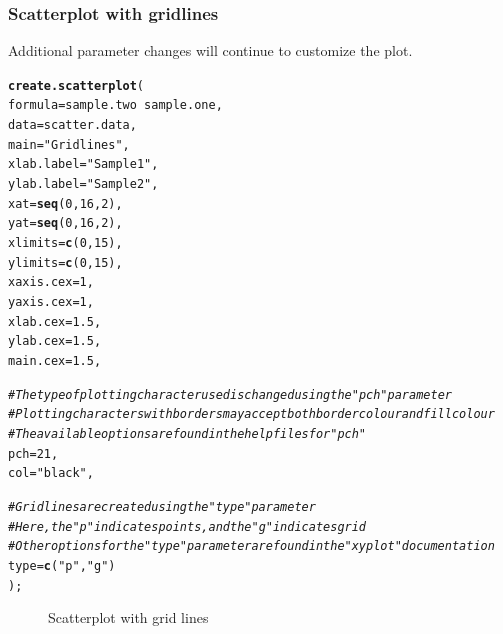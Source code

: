 \documentclass[letterpaper]{article}\usepackage[]{graphicx}\usepackage[]{color}
\makeatletter
\newcommand{\hlnum}[1]{\textcolor[rgb]{0.686,0.059,0.569}{#1}}%
\newcommand{\hlstr}[1]{\textcolor[rgb]{0.192,0.494,0.8}{#1}}%
\newcommand{\hlcom}[1]{\textcolor[rgb]{0.678,0.584,0.686}{\textit{#1}}}%
\newcommand{\hlopt}[1]{\textcolor[rgb]{0,0,0}{#1}}%
\newcommand{\hlstd}[1]{\textcolor[rgb]{0.345,0.345,0.345}{#1}}%
\newcommand{\hlkwc}[1]{\textcolor[rgb]{0.333,0.667,0.333}{#1}}%
\newcommand{\hlkwd}[1]{\textcolor[rgb]{0.737,0.353,0.396}{\textbf{#1}}}%
\newenvironment{kframe}{%
 \def\at@end@of@kframe{}%
 \ifinner\ifhmode%
  \def\at@end@of@kframe{\end{minipage}}%
  \begin{minipage}{\columnwidth}%
 \fi\fi%
 \def\FrameCommand##1{\hskip\@totalleftmargin \hskip-\fboxsep
 \colorbox{shadecolor}{##1}\hskip-\fboxsep
     \hskip-\linewidth \hskip-\@totalleftmargin \hskip\columnwidth}%
 \MakeFramed {\advance\hsize-\width
   \@totalleftmargin\z@ \linewidth\hsize
   \@setminipage}}%
 {\par\unskip\endMakeFramed%
 \at@end@of@kframe}
\newenvironment{knitrout}{}{} %
\makeatother
\begin{document}
\subsubsection{Scatterplot with gridlines}
Additional parameter changes will continue to customize the plot.
\begin{knitrout}
\color{fgcolor}\begin{kframe}
\begin{alltt}
\hlkwd{create.scatterplot}\hlstd{(}
    \hlkwc{formula} \hlstd{= sample.two} \hlopt{~} \hlstd{sample.one,}
    \hlkwc{data} \hlstd{= scatter.data,}
    \hlkwc{main} \hlstd{=} \hlstr{"Gridlines"}\hlstd{,}
    \hlkwc{xlab.label} \hlstd{=} \hlstr{"Sample 1"}\hlstd{,}
    \hlkwc{ylab.label} \hlstd{=} \hlstr{"Sample 2"}\hlstd{,}
    \hlkwc{xat} \hlstd{=} \hlkwd{seq}\hlstd{(}\hlnum{0}\hlstd{,} \hlnum{16}\hlstd{,} \hlnum{2}\hlstd{),}
    \hlkwc{yat} \hlstd{=} \hlkwd{seq}\hlstd{(}\hlnum{0}\hlstd{,} \hlnum{16}\hlstd{,} \hlnum{2}\hlstd{),}
    \hlkwc{xlimits} \hlstd{=} \hlkwd{c}\hlstd{(}\hlnum{0}\hlstd{,} \hlnum{15}\hlstd{),}
    \hlkwc{ylimits} \hlstd{=} \hlkwd{c}\hlstd{(}\hlnum{0}\hlstd{,} \hlnum{15}\hlstd{),}
    \hlkwc{xaxis.cex} \hlstd{=} \hlnum{1}\hlstd{,}
    \hlkwc{yaxis.cex} \hlstd{=} \hlnum{1}\hlstd{,}
    \hlkwc{xlab.cex} \hlstd{=} \hlnum{1.5}\hlstd{,}
    \hlkwc{ylab.cex} \hlstd{=} \hlnum{1.5}\hlstd{,}
    \hlkwc{main.cex} \hlstd{=} \hlnum{1.5}\hlstd{,}

    \hlcom{# The type of plotting character used is changed using the "pch" parameter}
    \hlcom{# Plotting characters with borders may accept both border colour and fill colour}
    \hlcom{# The available options are found in the help files for "pch"}
    \hlkwc{pch} \hlstd{=} \hlnum{21}\hlstd{,}
    \hlkwc{col} \hlstd{=} \hlstr{"black"}\hlstd{,}

    \hlcom{# Gridlines are created using the "type" parameter}
    \hlcom{# Here, the "p" indicates points, and the "g" indicates grid}
    \hlcom{# Other options for the "type" parameter are found in the "xyplot" documentation}
    \hlkwc{type} \hlstd{=} \hlkwd{c}\hlstd{(}\hlstr{"p"}\hlstd{,} \hlstr{"g"}\hlstd{)}
    \hlstd{);}
\end{alltt}
\end{kframe}\begin{figure}[]


{\centering {} 

}

\caption[Scatterplot with grid lines]{Scatterplot with grid lines\label{fig:scatter3}}
\end{figure}


\end{knitrout}
\end{document}
